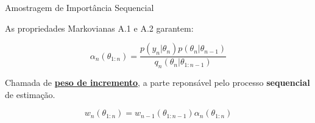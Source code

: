 \documentclass{beamer}
\begin{document}
%
%
%
%
%
%
%
%
%
%
%
%
%
%
%
%
%
%
%
%
%

\begin{frame}{Amostragem de Importância Sequencial}

As propriedades Markovianas A.1 e A.2 garantem:

$$
\alpha_n(\theta_{1:n}) = \frac{p(y_{n}|\theta_n)p(\theta_{n}|\theta_{n-1})}{q_n(\theta_n|\theta_{1:n-1})}
$$

\pause

Chamada de \underline{\textbf{peso de incremento}}, a parte reponsável pelo processo \textbf{sequencial} de estimação.


$$
w_n(\theta_{1:n}) = w_{n-1}(\theta_{1:n-1}) \alpha_n(\theta_{1:n})
$$


\end{frame}
\end{document}
